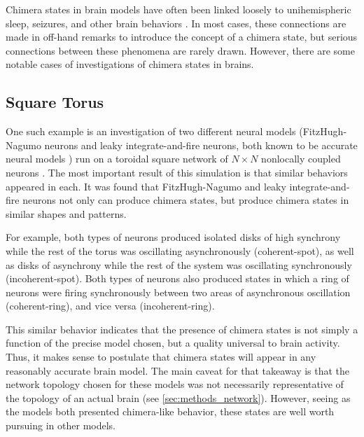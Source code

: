 Chimera states in brain models have often been linked loosely to
unihemispheric sleep,
seizures,
and other brain behaviors \cite{Abrams2008,Panaggio2015,Martens2013,Abrams2004,Shanahan2010,Hohlein2019,Bansal2019,Chouzouris2018}.
In most cases,
these connections are made in off-hand remarks to introduce the concept of a chimera state,
but serious connections between these phenomena are rarely drawn.
However,
there are some notable cases of investigations of chimera states in brains.

\subsection{Square Torus}
\label{sec:lit_review_chimera_square_torus}
One such example is an investigation of two different neural models
(FitzHugh-Nagumo neurons and leaky integrate-and-fire neurons, both known to be accurate neural models \cite{Deco2008})
run on a toroidal square network of $N \times N$ nonlocally coupled neurons \cite{Schmidt2017}.
The most important result of this simulation is that similar behaviors appeared in each.
It was found that FitzHugh-Nagumo and leaky integrate-and-fire neurons not only can produce chimera states,
but produce chimera states in similar shapes and patterns.

For example,
both types of neurons produced isolated disks of high synchrony while the rest of the torus was oscillating asynchronously (coherent-spot),
as well as disks of asynchrony while the rest of the system was oscillating synchronously (incoherent-spot).
Both types of neurons also produced states in which a ring of neurons were firing synchronously
between two areas of asynchronous oscillation (coherent-ring),
and vice versa (incoherent-ring).

This similar behavior indicates that the presence of chimera states is not simply a function of the precise model chosen,
but a quality universal to brain activity.
Thus, it makes sense to postulate that chimera states will appear in any reasonably accurate brain model.
The main caveat for that takeaway is that the network topology chosen for these models was not necessarily representative of the topology of an actual brain (see \cref{sec:methods_network}).
However, seeing as the models both presented chimera-like behavior,
these states are well worth pursuing in other models.

